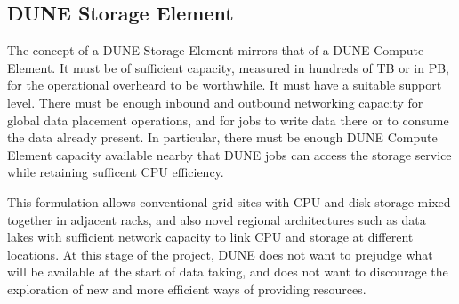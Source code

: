 \documentclass[../main-v1.tex]{subfiles}
\begin{document}
\subsection{DUNE Storage Element}
\label{sec:cm:dse}

The concept of a DUNE Storage Element mirrors that of a DUNE Compute Element. It must be of sufficient capacity, measured in hundreds of TB or in PB, for the operational overheard to be worthwhile. It must have a suitable support level. %
There must be enough inbound and outbound networking capacity for global data placement operations, and for jobs to write data there or to consume the data already present. In particular, there must be %
enough DUNE Compute Element capacity available nearby %
that DUNE jobs can access the storage service %
while retaining sufficent CPU efficiency.

This formulation allows conventional grid sites with CPU and disk storage mixed together in adjacent racks, and also novel regional architectures such as data lakes %
with sufficient network capacity to link CPU and storage at different locations. At this stage of the project, DUNE does not want to prejudge what will be available at the start of data taking, and does not want to discourage the exploration of new and more efficient ways of providing resources.


\end{document}
